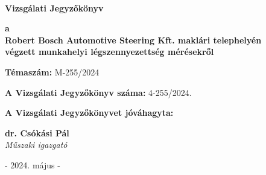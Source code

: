 \documentclass[a4paper,12pt]{article}
\begin{document}
	
	
	\thispagestyle{firstpage}
	
	\begin{flushleft}
		{\footnotesize  
			\textbf{
				 \\
				\vspace{-2mm} 
			}
		}
	\end{flushleft}
	
	\vfill
	
	\begin{center}
		{\Huge \textbf{Vizsgálati Jegyzőkönyv}}
	\end{center}
	
	\vfill
	
	\begin{center}
		\large
		\textbf{a} \\
		\textbf{Robert Bosch Automotive Steering Kft. maklári telephelyén \\
			végzett munkahelyi légszennyezettség mérésekről}
	\end{center}
	
	\vfill
	
	\begin{center}
		\textbf{Témaszám:} M-255/2024
	\end{center}    
	
	\vfill
	
	\begin{center}
		\textbf{A Vizsgálati Jegyzőkönyv száma:} 4-255/2024.
	\end{center}
	
	\begin{center}
		\textbf{A Vizsgálati Jegyzőkönyvet jóváhagyta:}
	\end{center}    
	
	\vfill
	
	\begin{center}
		\textbf{dr. Csókási Pál}\\
		\textit{Műszaki igazgató} \\
	\end{center}    
	
	\vfill
	
	\begin{center}
		- 2024. május -
	\end{center}    
	
	\vfill
	
\end{document}
